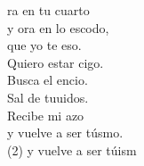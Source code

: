 \begin{cancion}%
	ra en tu cuarto\\
	y ora en lo escodo,\\
	que yo te eso.\\
	Quiero estar cigo.\\
	Busca el encio.\\
	Sal de tuuidos.\\
	Recibe mi azo\\
	y vuelve a ser túsmo.\\
	(2) y vuelve a ser túism  \\
\end{cancion}%
